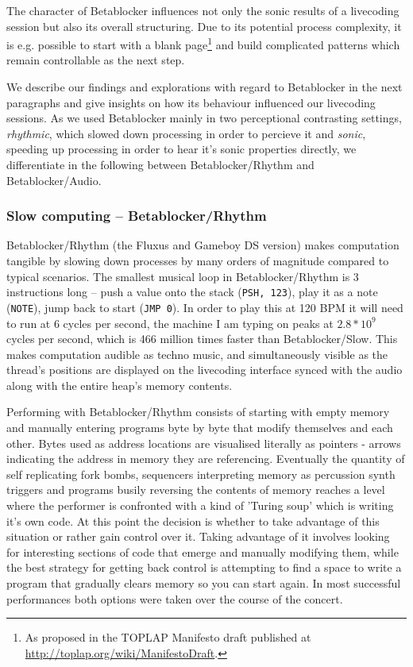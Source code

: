 \documentclass[letterpaper, 12pt]{article}
\begin{document}
The character of Betablocker influences not only the sonic results of a livecoding session but also its overall structuring.
Due to its potential process complexity, it is e.g. possible to start with a blank page\footnote{As proposed in the TOPLAP Manifesto draft published at \url{http://toplap.org/wiki/ManifestoDraft}.}
and build complicated patterns which remain controllable as the next step.

We describe our findings and explorations with regard to Betablocker in the next paragraphs and give insights on how its behaviour influenced our livecoding sessions.
As we used Betablocker mainly in two perceptional contrasting settings, \emph{rhythmic}, which slowed down processing in order to percieve it and \emph{sonic}, speeding up processing in order to hear it's sonic properties directly, we differentiate in the following between Betablocker/Rhythm and Betablocker/Audio.

\subsubsection{Slow computing -- Betablocker/Rhythm}
\label{sub:slow_computing}


Betablocker/Rhythm (the Fluxus and Gameboy DS version) makes computation tangible by slowing down processes by many orders of magnitude compared to typical scenarios. 
The smallest musical loop in Betablocker/Rhythm is 3 instructions long -- push a value onto the stack (\texttt{PSH, 123}), play it as a note (\texttt{NOTE}), jump back to start (\texttt{JMP 0}). 
In order to play this at 120 BPM it will need to run at 6 cycles per second, the machine I am typing on peaks at $2.8*10^9$ cycles per second, which is 466 million times faster than Betablocker/Slow. This makes computation audible as techno music, and simultaneously visible as the thread's positions are displayed on the livecoding interface synced with the audio along with the entire heap's memory contents.

Performing with Betablocker/Rhythm consists of starting with empty memory and manually entering programs byte by byte that modify themselves and each other. Bytes used as address locations are visualised literally as pointers - arrows indicating the address in memory they are referencing. 
Eventually the quantity of self replicating fork bombs, sequencers interpreting memory as percussion synth triggers and programs busily reversing the contents of memory reaches a level where the performer is confronted with a kind of 'Turing soup' which is writing it's own code. 
At this point the decision is whether to take advantage of this situation or rather gain control over it.
Taking advantage of it involves looking for interesting sections of code that emerge and manually modifying them, while the best strategy for getting back control is attempting to find a space to write a program that gradually clears memory so you can start again. 
In most successful performances both options were taken over the course of the concert.
\end{document}
